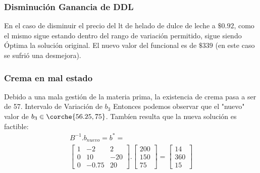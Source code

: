 \begin{homeworkProblem}[-1][Heladería]
\subsubsection{Disminución Ganancia de DDL}
En el caso de disminuir el precio del lt de helado de dulce de leche a $\$0.92$, como el mismo sigue estando dentro del rango de variación permitido, sigue siendo Óptima la solución original. El nuevo valor del funcional es de $\$339$ (en este caso se sufrió una desmejora).


\subsubsection{Crema en mal estado}
Debido a una mala gestión de la materia prima, la existencia de crema pasa a ser de 57.
Intervalo de Variación de $b_3$
Entonces podemos observar que el "nuevo" valor de $b_3 \in \corche{56.25,75}$. Tambíen resulta que la nueva solución es factible:
\begin{align*}
    B^{-1}.b_{nuevo}=b^{*}=
    \\
    \begin{bmatrix}
   1 & -2 & 2 \\
   0 & 10 & -20 \\
   0 & -0.75 & 20
  \end{bmatrix}.
  \begin{bmatrix}
      200 \\
      150 \\
      75
  \end{bmatrix} = 
  \begin{bmatrix}
      14 \\
      360 \\
      15
  \end{bmatrix}
\end{align*}


\end{homeworkProblem}
